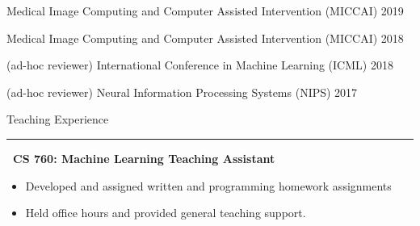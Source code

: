 \documentclass[]{article}
\begin{document}
\noindent Medical Image Computing and Computer Assisted Intervention (MICCAI) \hfill 2019

\noindent Medical Image Computing and Computer Assisted Intervention (MICCAI) \hfill 2018

\noindent (ad-hoc reviewer) International Conference in Machine Learning (ICML) \hfill 2018

\noindent (ad-hoc reviewer) Neural Information Processing Systems (NIPS) \hfill 2017
\fi

\iffalse
\vspace{5pt}
{\LARGE Teaching Experience}
\vspace{3pt}
\hrule
\vspace{5pt}

 \newline
	{\bf \ CS 760: Machine Learning Teaching Assistant}
	\begin{itemize}[label={$\bullet$}]
		\item Developed and assigned written and programming homework assignments
		\item Held office hours and provided general teaching support.
	\end{itemize} 
\end{document}
